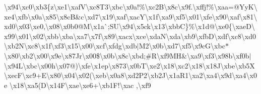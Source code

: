 \begin{DoxyCompactItemize}
\textbackslash{}x94\textbackslash{}xc0\textbackslash{}xb3\{z\textbackslash{}xe1\textbackslash{}xaf\+V\textbackslash{}xc8\+T3\textbackslash{}xbc\textbackslash{}x0a!\%\textbackslash{}xc2\+B\textbackslash{}x8c\textbackslash{}x9f.\textbackslash{}xffj!\%\textbackslash{}xaa=@\+Yy\+K\textbackslash{}xe4\textbackslash{}xfb\textbackslash{}x0a\textbackslash{}x85\textbackslash{}x8c\+B\&c\textbackslash{}xd7\textbackslash{}x19\textbackslash{}xaf\textbackslash{}xac\+Y\textbackslash{}x1f\textbackslash{}xa9\textbackslash{}xf5\textbackslash{}x01\textbackslash{}xfe\textbackslash{}x90\textbackslash{}xaf\textbackslash{}x81\textbackslash{}xd0\textbackslash{}x03\textbackslash{}xe0,\textbackslash{}x08\textbackslash{}x0b0@\+M\textbackslash{}x1a\`{};\+S\+U\textbackslash{}x94\textbackslash{}x5ck\textbackslash{}x13\textbackslash{}xbb\+C\}\%\textbackslash{}x1d@\textbackslash{}xe0\{\textbackslash{}xae\+D\textbackslash{}x99\textbackslash{}x01\textbackslash{}x02\textbackslash{}xbb\textbackslash{}xba\textbackslash{}xa7\textbackslash{}x7f\textbackslash{}x89\textbackslash{}xacx\textbackslash{}xce\textbackslash{}xda\+N\textbackslash{}xda\textbackslash{}xb9\textbackslash{}xfb\+D\textbackslash{}xdf\textbackslash{}xc8\textbackslash{}xd0\textbackslash{}xb2\+N\textbackslash{}xc8\textbackslash{}x1f\textbackslash{}xf3\textbackslash{}x15\textbackslash{}x00\textbackslash{}xcf\textbackslash{}xfdg\textbackslash{}xdb$\vert$\+M2\textbackslash{}x0b\textbackslash{}xd7\textbackslash{}xf5\textbackslash{}x9c\+G\textbackslash{}xbc$\ast$\textbackslash{}x80\textbackslash{}xb2\textbackslash{}x00\textbackslash{}x9e\textbackslash{}x87\+Jr\textbackslash{}x00\$\textbackslash{}x0b\textbackslash{}x8c\textbackslash{}xbd;\#\+R\textbackslash{}xf9\+M\+H\&\textbackslash{}xa9\textbackslash{}xf3\textbackslash{}x98b\textbackslash{}xf0b$\vert$\textbackslash{}x94\+L\textbackslash{}xbc\textbackslash{}x00h\textbackslash{}x07@)\textbackslash{}xfe\textbackslash{}x1ep\textbackslash{}x873\textbackslash{}x0b\+T\textbackslash{}xe2\textbackslash{}x18\textbackslash{}xc2\textbackslash{}x18\textbackslash{}x18\+J\textbackslash{}xbe\textbackslash{}xb5\+X\textbackslash{}xec\+F\textbackslash{}xc9+\+E\textbackslash{}x80\textbackslash{}x04\textbackslash{}x02(\textbackslash{}xeb\textbackslash{}x0a8\textbackslash{}xd2\+P2\textbackslash{}xb2\+J\textbackslash{}x1a\+R1\textbackslash{}xa2\textbackslash{}xa4\textbackslash{}x9d\textbackslash{}xa4\textbackslash{}x0e \textbackslash{}x18\textbackslash{}xa5(\+D\textbackslash{}x14\+F\textbackslash{}xae\textbackslash{}xe6+\textbackslash{}xb1\+F!\textbackslash{}xac ,\textbackslash{}xf9 
\end{DoxyCompactItemize}

